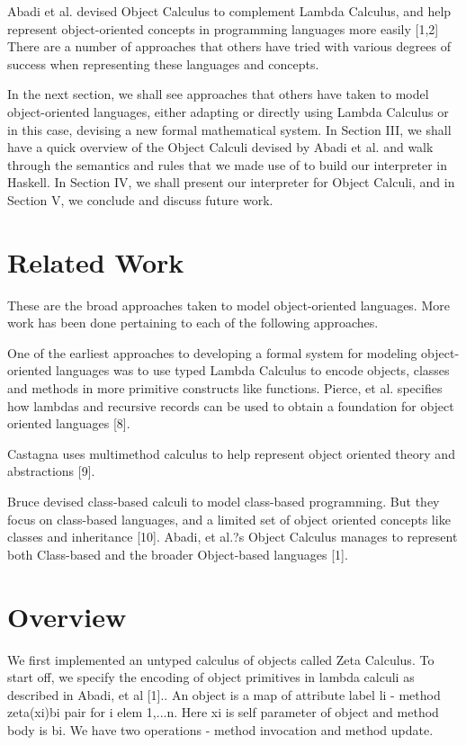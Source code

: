 \documentclass[10pt,twocolumn]{article}
\begin{document}
Abadi et al. devised Object Calculus to complement Lambda Calculus, and help represent object-oriented concepts in programming languages more easily [1,2] There are a number of approaches that others have tried with various degrees of success when representing these languages and concepts. 

In the next section, we shall see approaches that others have taken to model object-oriented languages, either adapting or directly using Lambda Calculus or in this case, devising a new formal mathematical system. In Section III, we shall have a quick overview of the Object Calculi devised by Abadi et al. and walk through the semantics and rules that we made use of to build our interpreter in Haskell. In Section IV, we shall present our interpreter for Object Calculi, and in Section V, we conclude and discuss future work. 

\section{Related Work}

These are the broad approaches taken to model object-oriented languages. More work has been done pertaining to each of the following approaches. 

One of the earliest approaches to developing a formal system for modeling object-oriented languages was to use typed Lambda Calculus to encode objects, classes and methods in more primitive constructs like functions. Pierce, et al. specifies how lambdas and recursive records can be used to obtain a foundation for object oriented languages [8]. 

Castagna uses multimethod calculus to help represent object oriented theory and abstractions [9]. 

Bruce devised class-based calculi to model class-based programming. But they focus on class-based languages, and a limited set of object oriented concepts like classes and inheritance [10]. Abadi, et al.?s Object Calculus manages to represent both Class-based and the broader Object-based languages [1]. 

\section{Overview}

We first implemented an untyped calculus of objects called Zeta Calculus. To start off, we specify the encoding of object primitives in lambda calculi as described in Abadi, et al [1].. An object is a map of attribute label li - method zeta(xi)bi pair for i elem 1,...n. Here xi is self parameter of object and method body is bi. We have two operations - method invocation and method update. 
\end{document}
